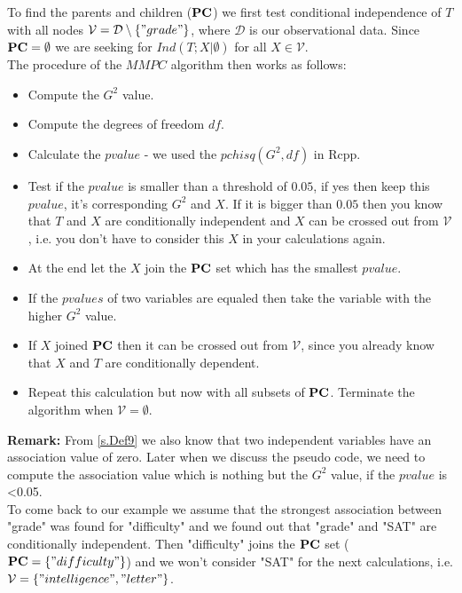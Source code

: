 			 \label{img.gradeSelected}

			To find the parents and children (${\textbf{PC}}$) we first test conditional independence of $T$ with all nodes $\mathcal{V} = \mathcal{D} \setminus \{"grade"\}$, where $\mathcal{D}$ is our observational data. Since ${\textbf{PC}} = \emptyset$ we are seeking for $Ind(T; X | \emptyset)$ for all $X \in \mathcal{V}$.\\
			The procedure of the $MMPC$ algorithm then works as follows:

			\begin{itemize}
				\item Compute the $G^{2}$ value.
				\item Compute the degrees of freedom $df$.
				\item Calculate the $pvalue$ - we used the $pchisq(G^{2}, df)$ in Rcpp.
				\item Test if the $pvalue$ is smaller than a threshold of $0.05$, if yes then keep this $pvalue$, it's corresponding $G^{2}$ and $X$. If it is bigger than $0.05$ then you know that $T$ and $X$ are conditionally independent and $X$ can be crossed out from $\mathcal{V}$, i.e. you don't have to consider this $X$ in your calculations again.
				\item At the end let the $X$ join the ${\textbf{PC}}$ set which has the smallest $pvalue$.
				\item If the $pvalues$ of two variables are equaled then take the variable with the higher $G^{2}$ value.
				\item If $X$ joined ${\textbf{PC}}$ then it can be crossed out from $\mathcal{V}$, since you already know that $X$ and $T$ are conditionally dependent.
				\item Repeat this calculation but now with all subsets of ${\textbf{PC}}$. Terminate the algorithm when $\mathcal{V} = \emptyset$.
			\end{itemize}

			\textbf{Remark:} From \autoref{s.Def9} we also know that two independent variables have an association value of zero. Later when we discuss the pseudo code, we need to compute the association value which is nothing but the $G^{2}$ value, if the $pvalue$ is \textless 0.05. \\

			To come back to our example we assume that the strongest association between "grade" was found for "difficulty" and we found out that "grade" and "SAT" are conditionally independent. Then "difficulty" joins the ${\textbf{PC}}$ set (${\textbf{PC}} = \{"difficulty"\}$) and we won't consider "SAT" for the next calculations, i.e. $\mathcal{V} = \{ "intelligence", "letter" \}$.

